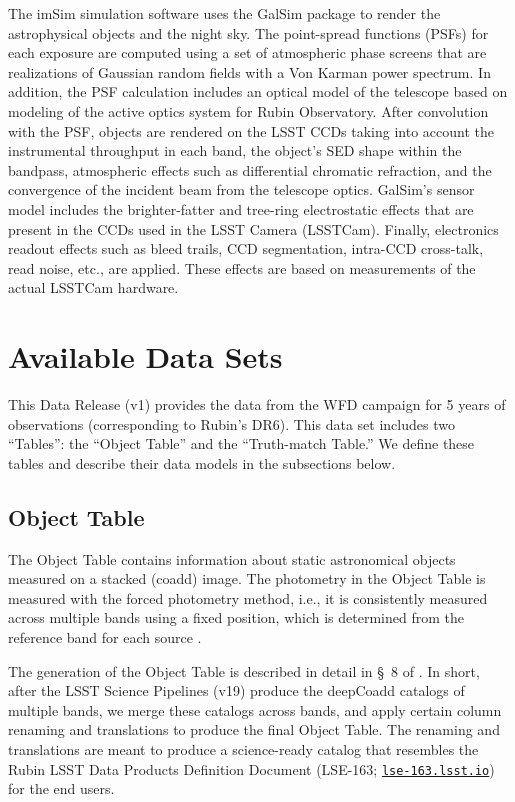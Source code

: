 \documentclass[modern]{descnote}
\newcommand*{\https}[1]{\href{https://#1}{\nolinkurl{#1}}}
\begin{document}
The imSim simulation software uses the GalSim package \citep{2015A&C....10..121R} to render the astrophysical objects and the night sky.  The point-spread functions (PSFs) for each exposure are computed using a set of atmospheric phase screens that are realizations of Gaussian random fields with a Von Karman power spectrum.  In addition, the PSF calculation includes an optical model of the telescope based on modeling of the active optics system for Rubin Observatory.  After convolution with the PSF, objects are rendered on the LSST CCDs taking into account the instrumental throughput in each band, the object's SED shape within the bandpass, atmospheric effects such as differential chromatic refraction, and the convergence of the incident beam from the telescope optics. GalSim's sensor model includes the brighter-fatter and tree-ring electrostatic effects that are present in the CCDs used in the LSST Camera (LSSTCam).  Finally, electronics readout effects such as bleed trails, CCD segmentation, intra-CCD cross-talk, read noise, etc., are applied.  These effects are based on measurements of the actual LSSTCam hardware.


\section{Available Data Sets}
\label{sec:products}

This Data Release (v1) provides the data from the WFD campaign for 5 years of observations (corresponding to Rubin's DR6). This data set includes two ``Tables'': the ``Object Table'' and the ``Truth-match Table.'' We define these tables and describe their data models in the subsections below. 

\subsection{Object Table}
\label{sec:object}

The Object Table contains information about static astronomical objects measured on a stacked (coadd) image. The photometry in the Object Table is measured with the forced photometry method, i.e., it is consistently measured across multiple bands using a fixed position, which is determined from the reference band for each source \citep[Sec.~3.4 of][]{10.1093/pasj/psx080}. 

The generation of the Object Table is described in detail in \S~8 of \cite{2020arXiv201005926L}. In short, after the LSST Science Pipelines (v19) produce the deepCoadd catalogs of multiple bands, we merge these catalogs across bands, and apply certain column renaming and translations to produce the final Object Table. The renaming and translations are meant to produce a science-ready catalog that resembles the Rubin LSST Data Products Definition Document (LSE-163; \https{lse-163.lsst.io}) for the end users. 
\end{document}
